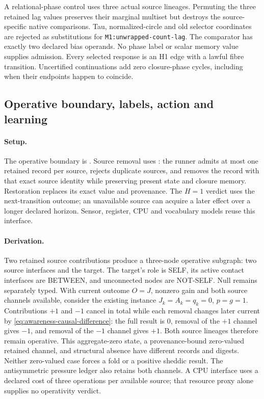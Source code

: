 A relational-phase control uses three actual source lineages. Permuting the
three retained lag values preserves their marginal multiset but destroys the
source-specific native comparisons. Tau, normalized-circle and old selector
coordinates are rejected as substitutions for
\texttt{M1:unwrapped-count-lag}. The comparator has exactly two declared bias
operands. No phase label or scalar memory value supplies admission.
Every selected response is an H1 edge with a lawful fibre transition.
Uncertified continuations add zero closure-phase cycles, including when their
endpoints happen to coincide.

\subsection{Operative boundary, labels, action and learning}
\label{sec:self-proprio-toys}
\paragraph{Setup.}
The operative boundary is .
Source removal uses : the
runner admits at most one retained record per source, rejects duplicate
sources, and removes the record with that exact source identity while
preserving present state and closure memory. Restoration replaces its exact
value and provenance. The \(H=1\) verdict uses the next-transition outcome;
an unavailable source can acquire a later effect over a longer declared horizon.
Sensor, register, CPU and vocabulary models reuse this interface.
\paragraph{Derivation.}
Two retained source contributions produce a three-node operative subgraph:
two source interfaces and the target. The target's role is SELF, its active contact
interfaces are BETWEEN, and unconnected nodes are NOT-SELF. Null remains
separately typed. With current outcome \(O=J\), nonzero gain and both source
channels available, consider the existing instance \(J_k=A_k=q_k=0\),
\(p=g=1\). Contributions \(+1\) and \(-1\) cancel in total while each
removal changes later current by \eqref{eq:awareness-causal-difference}: the full result is \(0\), removal of the
\(+1\) channel gives \(-1\), and removal of the \(-1\) channel gives \(+1\).
Both source lineages therefore remain operative. This aggregate-zero state,
a provenance-bound zero-valued retained channel, and structural absence have
different records and digests. Neither zero-valued case forces a fold or a
positive sheddic result. The antisymmetric pressure ledger also retains both channels.
A CPU interface uses a
declared cost of three operations per available source; that resource proxy
alone supplies no operativity verdict.

